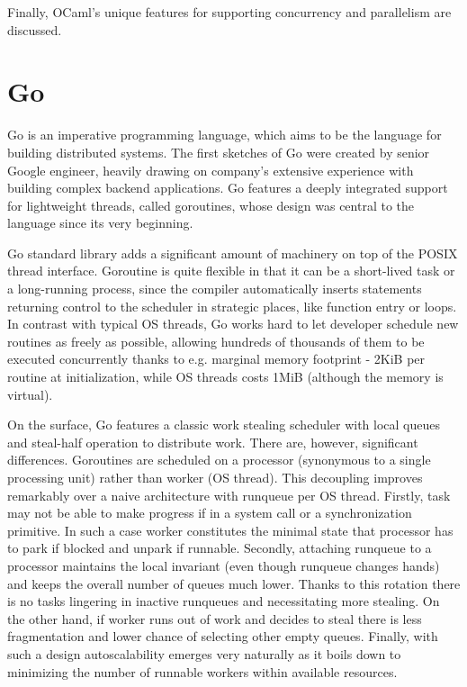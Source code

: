 \documentclass[12pt,a4paper,twoside]{report}
\begin{document}
Finally, OCaml's unique features for supporting concurrency and parallelism are discussed. 

\section{Go}
\label{section:rel-work-go}
Go is an imperative programming language, which aims to be the language for building distributed systems. The first sketches of Go were created by senior Google engineer, heavily drawing on company's extensive experience with building complex backend applications. Go features a deeply integrated support for lightweight threads, called goroutines, whose design was central to the language since its very beginning.

Go standard library adds a significant amount of machinery on top of the POSIX thread interface. Goroutine is quite flexible in that it can be a short-lived task or a long-running process, since the compiler automatically inserts statements returning control to the scheduler in strategic places, like function entry or loops. In contrast with typical OS threads, Go works hard to let developer schedule new routines as freely as possible, allowing hundreds of thousands of them to be executed concurrently thanks to e.g. marginal memory footprint - 2KiB per routine at initialization, while OS threads costs 1MiB (although the memory is virtual). 

On the surface, Go features a classic work stealing scheduler with local queues and steal-half operation to distribute work. There are, however, significant differences. Goroutines are scheduled on a processor (synonymous to a single processing unit) rather than worker (OS thread). This decoupling improves remarkably over a naive architecture with runqueue per OS thread. Firstly, task may not be able to make progress if in a system call or a synchronization primitive. In such a case worker constitutes the minimal state that processor has to park if blocked and unpark if runnable. Secondly, attaching runqueue to a processor maintains the local invariant (even though runqueue changes hands) and keeps the overall number of queues much lower. Thanks to this rotation there is no tasks lingering in inactive runqueues and necessitating more stealing. On the other hand, if worker runs out of work and decides to steal there is less fragmentation and lower chance of selecting other empty queues. Finally, with such a design autoscalability emerges very naturally as it boils down to minimizing the number of runnable workers within available resources. 
\end{document}
